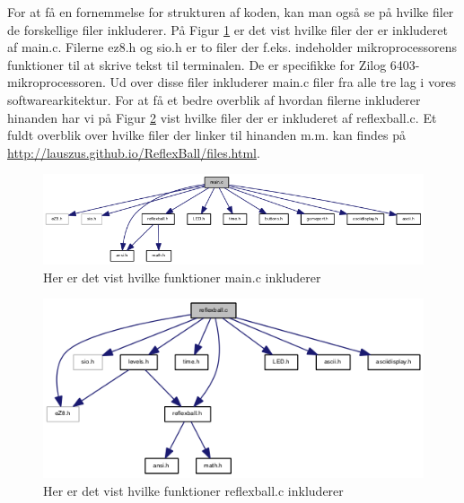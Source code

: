 For at få en fornemmelse for strukturen af koden, kan man også se på hvilke filer de forskellige filer inkluderer. På Figur \ref{fig:main_incl} er det vist hvilke filer der er inkluderet af main.c. Filerne ez8.h og sio.h er to filer der f.eks. indeholder mikroprocessorens funktioner til at skrive tekst til terminalen. De er specifikke for Zilog 6403-mikroprocessoren. Ud over disse filer inkluderer main.c filer fra alle tre lag i vores softwarearkitektur. For at få et bedre overblik af hvordan filerne inkluderer hinanden har vi på Figur \ref{fig:reflexball_incl} vist hvilke filer der er inkluderet af reflexball.c. Et fuldt overblik over hvilke filer der linker til hinanden m.m. kan findes på \url{http://lauszus.github.io/ReflexBall/files.html}.

\begin{figure}[H]
\centering
\includegraphics[scale=0.6]{figs/main_incl.png}
\caption{Her er det vist hvilke funktioner main.c inkluderer}
\label{fig:main_incl}
\end{figure}

\begin{figure}[H]
\centering
\includegraphics[scale=0.8]{figs/reflexball_incl.png}
\caption{Her er det vist hvilke funktioner reflexball.c inkluderer}
\label{fig:reflexball_incl}
\end{figure}